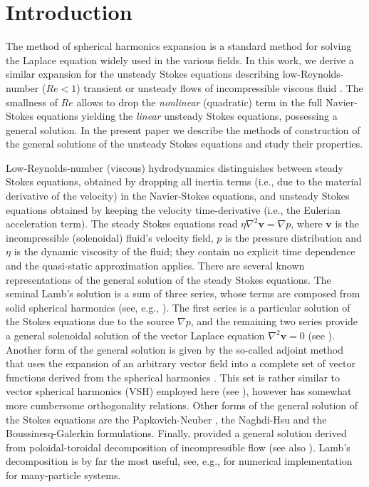 \documentclass[aps,prx,twocolumn,amsmath,amssymb,amsfonts]{revtex4-2}
\begin{document}
\maketitle

\section{Introduction}

The method of spherical harmonics expansion is a standard method for solving the Laplace equation widely used in the various fields. In this work, we derive a similar expansion for the unsteady Stokes equations describing low-Reynolds-number ($Re<1$) transient or unsteady flows of incompressible viscous fluid \cite{kim,hb,LL}. The smallness of $Re$ allows to drop the \emph{nonlinear} (quadratic) term in the full Navier-Stokes equations yielding the \emph{linear} unsteady Stokes equations, possessing a general solution.  In the present paper we describe the methods of construction of the general solutions of the unsteady Stokes equations and study their properties.

Low-Reynolds-number (viscous) hydrodynamics distinguishes between steady Stokes equations, obtained by dropping all inertia terms (i.e., due to the material derivative of the velocity) in the Navier-Stokes equations, and unsteady Stokes equations obtained by keeping the velocity time-derivative (i.e., the Eulerian acceleration term). The steady Stokes equations read $\eta\nabla^2\bm v =\nabla p$, where $\bm v$ is the incompressible (solenoidal) fluid's velocity field, $p$ is the pressure distribution and $\eta$ is the dynamic viscosity of the fluid; they contain no explicit time dependence and the quasi-static approximation applies. There are several known representations of the general solution of the steady Stokes equations. The seminal Lamb's solution \cite{Lamb} is a sum of three series, whose terms are composed from solid spherical harmonics (see, e.g., \cite{hb}). The first series is a particular solution of the Stokes equations due to the source $\nabla p$, and the remaining two series provide a general solenoidal solution of the vector Laplace equation $\nabla^2\bm v=0$ (see \cite{kim}). Another form of the general solution is given by the so-called adjoint method that uses the expansion of an arbitrary vector field into a complete set of vector functions derived from the spherical harmonics \cite{kim,SF}. This set is rather similar to vector spherical harmonics (VSH) employed here (see \cite{sph}), however has somewhat more cumbersome orthogonality relations. Other forms of the general solution of the Stokes equations are the Papkovich-Neuber \cite{ps,ne,cong}, the Naghdi-Hsu \cite{su,xu,se} and the Boussinesq-Galerkin \cite{bousi,xu} formulations. Finally, \cite{op} provided a general solution derived from poloidal-toroidal decomposition of incompressible flow \cite{chan,cha} (see also \cite{ranger}). Lamb's decomposition is by far the most useful, see, e.g., \cite{Fil} for numerical implementation for many-particle systems.
\end{document}

